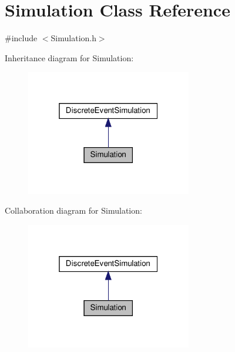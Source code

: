 \hypertarget{classSimulation}{}\section{Simulation Class Reference}
\label{classSimulation}


{\ttfamily \#include $<$Simulation.\+h$>$}



Inheritance diagram for Simulation\+:\nopagebreak
\begin{figure}[H]
\begin{center}
\leavevmode
\includegraphics[width=205pt]{classSimulation__inherit__graph}
\end{center}
\end{figure}


Collaboration diagram for Simulation\+:\nopagebreak
\begin{figure}[H]
\begin{center}
\leavevmode
\includegraphics[width=205pt]{classSimulation__coll__graph}
\end{center}
\end{figure}
